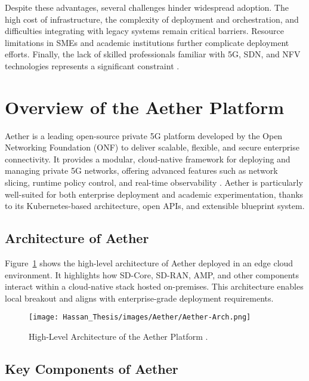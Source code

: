 Despite these advantages, several challenges hinder widespread adoption. The high cost of infrastructure, the complexity of deployment and orchestration, and difficulties integrating with legacy systems remain critical barriers. Resource limitations in SMEs and academic institutions further complicate deployment efforts. Finally, the lack of skilled professionals familiar with 5G, SDN, and NFV technologies represents a significant constraint \cite{5g_challenges_summary}.


\section{Overview of the Aether Platform}

Aether is a leading open-source private 5G platform developed by the Open Networking Foundation (ONF) to deliver scalable, flexible, and secure enterprise connectivity. It provides a modular, cloud-native framework for deploying and managing private 5G networks, offering advanced features such as network slicing, runtime policy control, and real-time observability \cite{aether_overview}. Aether is particularly well-suited for both enterprise deployment and academic experimentation, thanks to its Kubernetes-based architecture, open APIs, and extensible blueprint system.

\subsection*{Architecture of Aether}

Figure~\ref{fig:aether-arch} shows the high-level architecture of Aether deployed in an edge cloud environment. It highlights how SD-Core, SD-RAN, AMP, and other components interact within a cloud-native stack hosted on-premises. This architecture enables local breakout and aligns with enterprise-grade deployment requirements.

\begin{figure}[H]
    \centering
    \texttt{[image: Hassan\_Thesis/images/Aether/Aether-Arch.png]}
    \caption{High-Level Architecture of the Aether Platform \cite{aether_overview}.}
    \label{fig:aether-arch}
\end{figure}



\subsection*{Key Components of Aether}

